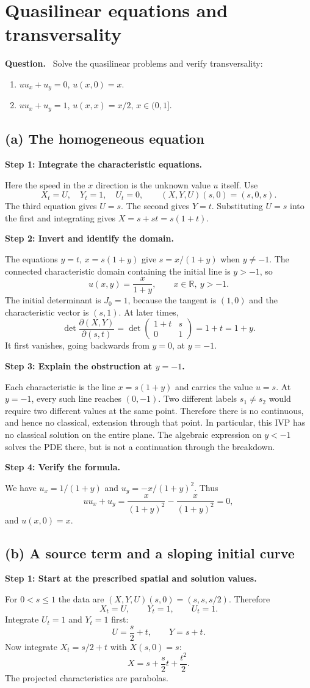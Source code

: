 \documentclass[11pt,a4paper]{article}
\newcommand{\R}{\mathbb R}
\newcommand{\step}[1]{\par\medskip\textbf{#1}\par}
\newenvironment{question}{\par\smallskip\begingroup\color{ink}\textbf{Question.}\ }{\par\endgroup\medskip}
\newcommand{\answer}[1]{\begin{equation*}\boxed{\displaystyle #1}\end{equation*}}
\newcommand{\problem}[1]{\clearpage\section{#1}}
\begin{document}
\problem{Quasilinear equations and transversality}
\begin{question}
Solve the quasilinear problems and verify transversality:
\begin{enumerate}[label=(\alph*)]
\item $uu_x+u_y=0$, $u(x,0)=x$.
\item $uu_x+u_y=1$, $u(x,x)=x/2$, $x\in(0,1]$.
\end{enumerate}
\end{question}
\subsection*{(a) The homogeneous equation}
\step{Step 1: Integrate the characteristic equations.}
Here the speed in the $x$ direction is the unknown value $u$ itself. Use
\[
 X_t=U,\quad Y_t=1,\quad U_t=0,\qquad
 (X,Y,U)(s,0)=(s,0,s).
\]
The third equation gives $U=s$. The second gives $Y=t$. Substituting $U=s$ into the first and integrating gives $X=s+st=s(1+t)$.

\step{Step 2: Invert and identify the domain.}
The equations $y=t$, $x=s(1+y)$ give $s=x/(1+y)$ when $y\ne-1$. The connected characteristic domain containing the initial line is $y>-1$, so
\answer{u(x,y)=\frac{x}{1+y},\qquad x\in\R,\ y>-1.}
The initial determinant is $J_0=1$, because the tangent is $(1,0)$ and the characteristic vector is $(s,1)$. At later times,
\[
 \det\frac{\partial(X,Y)}{\partial(s,t)}
 =\det\begin{pmatrix}1+t&s\\0&1\end{pmatrix}=1+t=1+y.
\]
It first vanishes, going backwards from $y=0$, at $y=-1$.

\step{Step 3: Explain the obstruction at $y=-1$.}
Each characteristic is the line $x=s(1+y)$ and carries the value $u=s$. At $y=-1$, every such line reaches $(0,-1)$. Two different labels $s_1\ne s_2$ would require two different values at the same point. Therefore there is no continuous, and hence no classical, extension through that point. In particular, this IVP has no classical solution on the entire plane. The algebraic expression on $y<-1$ solves the PDE there, but is not a continuation through the breakdown.

\step{Step 4: Verify the formula.}
We have $u_x=1/(1+y)$ and $u_y=-x/(1+y)^2$. Thus
\[
 uu_x+u_y=\frac{x}{(1+y)^2}-\frac{x}{(1+y)^2}=0,
\]
and $u(x,0)=x$.

\subsection*{(b) A source term and a sloping initial curve}
\step{Step 1: Start at the prescribed spatial and solution values.}
For $0<s\le1$ the data are $(X,Y,U)(s,0)=(s,s,s/2)$. Therefore
\[
 X_t=U,\qquad Y_t=1,\qquad U_t=1.
\]
Integrate $U_t=1$ and $Y_t=1$ first:
\[
 U=\frac{s}{2}+t,\qquad Y=s+t.
\]
Now integrate $X_t=s/2+t$ with $X(s,0)=s$:
\[
 X=s+\frac{s}{2}t+\frac{t^2}{2}.
\]
The projected characteristics are parabolas.
\end{document}
